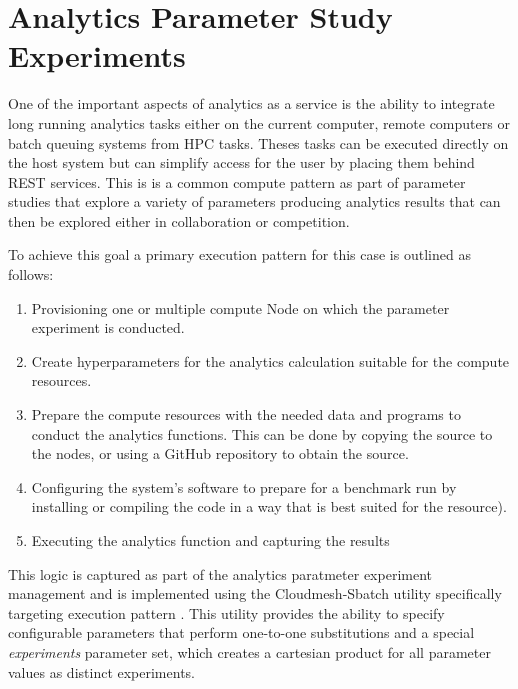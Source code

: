 \section{Analytics Parameter Study Experiments}

One of the important aspects of analytics as a service is the ability to integrate long running analytics tasks either 
on the current computer, remote computers or batch queuing systems from HPC tasks. Theses tasks can be 
executed directly on the host system but can simplify access for the user by placing them behind REST 
services. This is is a common compute pattern as part of parameter studies that explore a variety of 
parameters producing analytics results that can then be explored either in collaboration or competition. 

To achieve this goal a primary execution pattern for this case is outlined as follows:


\begin{enumerate}
    \item Provisioning one or multiple compute Node on which the parameter experiment is conducted.
    \item Create hyperparameters for the analytics calculation suitable for the compute resources.
    \item Prepare the compute resources with the needed data and programs to conduct the analytics 
          functions. This can be done by copying the source to the nodes, or using a GitHub repository to 
          obtain the source.
    \item Configuring the system's software to prepare for a benchmark run by installing or compiling the code 
          in a way that is best suited for the resource).
    \item Executing the analytics function and capturing the results
\end{enumerate}

This logic is captured as part of the analytics paratmeter experiment  management and is implemented using the Cloudmesh-Sbatch utility specifically targeting execution pattern \cite{repo-cloudmesh-sbatch}.
This utility provides the ability to specify configurable parameters that perform one-to-one substitutions and a special \textit{experiments} parameter set, which creates a  cartesian product for all parameter values as distinct experiments.


